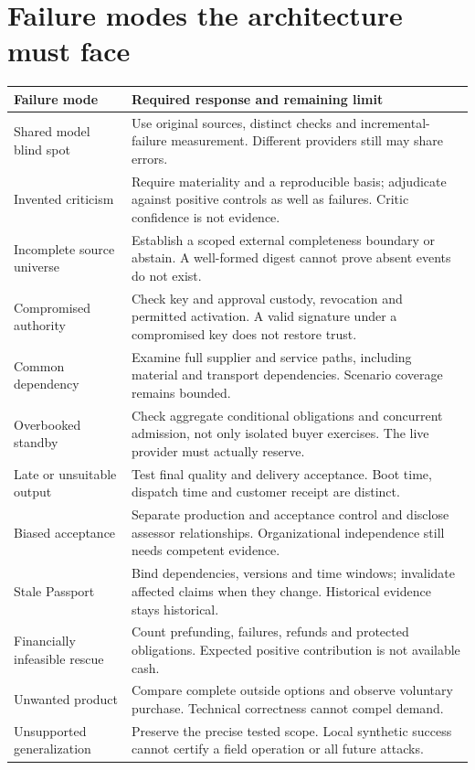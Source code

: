 \documentclass[11pt,a4paper]{article}
\newcommand{\chapterpage}{\clearpage}
\begin{document}
\chapterpage
\section{Failure modes the architecture must face}\label{sec:failures}
\begin{longtable}{P{.25\textwidth}P{.68\textwidth}}
\toprule
\textbf{Failure mode} & \textbf{Required response and remaining limit}\\
\midrule
\endhead
Shared model blind spot & Use original sources, distinct checks and incremental-failure measurement. Different providers still may share errors.\\
Invented criticism & Require materiality and a reproducible basis; adjudicate against positive controls as well as failures. Critic confidence is not evidence.\\
Incomplete source universe & Establish a scoped external completeness boundary or abstain. A well-formed digest cannot prove absent events do not exist.\\
Compromised authority & Check key and approval custody, revocation and permitted activation. A valid signature under a compromised key does not restore trust.\\
Common dependency & Examine full supplier and service paths, including material and transport dependencies. Scenario coverage remains bounded.\\
Overbooked standby & Check aggregate conditional obligations and concurrent admission, not only isolated buyer exercises. The live provider must actually reserve.\\
Late or unsuitable output & Test final quality and delivery acceptance. Boot time, dispatch time and customer receipt are distinct.\\
Biased acceptance & Separate production and acceptance control and disclose assessor relationships. Organizational independence still needs competent evidence.\\
Stale Passport & Bind dependencies, versions and time windows; invalidate affected claims when they change. Historical evidence stays historical.\\
Financially infeasible rescue & Count prefunding, failures, refunds and protected obligations. Expected positive contribution is not available cash.\\
Unwanted product & Compare complete outside options and observe voluntary purchase. Technical correctness cannot compel demand.\\
Unsupported generalization & Preserve the precise tested scope. Local synthetic success cannot certify a field operation or all future attacks.\\
\bottomrule
\end{longtable}
\end{document}

